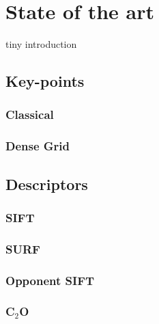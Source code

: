 \documentclass[12pt]{article}
\begin{document}
\section{State of the art}

tiny introduction

\subsection{Key-points}

\subsubsection{Classical}

\subsubsection{Dense Grid}


\subsection{Descriptors}

\subsubsection{SIFT}

\subsubsection{SURF}

\subsubsection{Opponent SIFT}

\subsubsection{C$_2$O}

\end{document}
